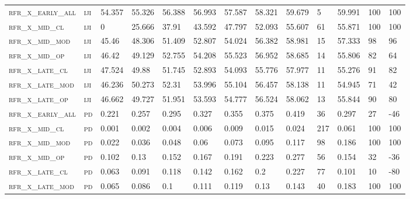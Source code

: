 \begin{landscape}
\begin{center}
\begin{footnotesize}
\begin{longtable}{lllllllllllll}
\textsc{rfr\_x\_early\_all} & \textsc{iji       }   & 54.357  & 55.326  & 56.388   & 56.993   & 57.587   & 58.321   & 59.679   & 5    & 59.991  & 100 & 100   \\
\textsc{rfr\_x\_mid\_cl   } & \textsc{iji       }   & 0       & 25.666  & 37.91    & 43.592   & 47.797   & 52.093   & 55.607   & 61   & 55.871  & 100 & 100   \\
\textsc{rfr\_x\_mid\_mod  } & \textsc{iji       }   & 45.46   & 48.306  & 51.409   & 52.807   & 54.024   & 56.382   & 58.981   & 15   & 57.333  & 98  & 96    \\
\textsc{rfr\_x\_mid\_op   } & \textsc{iji       }   & 46.42   & 49.129  & 52.755   & 54.208   & 55.523   & 56.952   & 58.685   & 14   & 55.806  & 82  & 64    \\
\textsc{rfr\_x\_late\_cl  } & \textsc{iji       }   & 47.524  & 49.88   & 51.745   & 52.893   & 54.093   & 55.776   & 57.977   & 11   & 55.276  & 91  & 82    \\
\textsc{rfr\_x\_late\_mod } & \textsc{iji       }   & 46.236  & 50.273  & 52.31    & 53.996   & 55.104   & 56.457   & 58.138   & 11   & 54.945  & 71  & 42    \\
\textsc{rfr\_x\_late\_op  } & \textsc{iji       }   & 46.662  & 49.727  & 51.951   & 53.593   & 54.777   & 56.524   & 58.062   & 13   & 55.844  & 90  & 80    \\
\textsc{rfr\_x\_early\_all} & \textsc{pd        }   & 0.221   & 0.257   & 0.295    & 0.327    & 0.355    & 0.375    & 0.419    & 36   & 0.297   & 27  & -46   \\
\textsc{rfr\_x\_mid\_cl   } & \textsc{pd        }   & 0.001   & 0.002   & 0.004    & 0.006    & 0.009    & 0.015    & 0.024    & 217  & 0.061   & 100 & 100   \\
\textsc{rfr\_x\_mid\_mod  } & \textsc{pd        }   & 0.022   & 0.036   & 0.048    & 0.06     & 0.073    & 0.095    & 0.117    & 98   & 0.186   & 100 & 100   \\
\textsc{rfr\_x\_mid\_op   } & \textsc{pd        }   & 0.102   & 0.13    & 0.152    & 0.167    & 0.191    & 0.223    & 0.277    & 56   & 0.154   & 32  & -36   \\
\textsc{rfr\_x\_late\_cl  } & \textsc{pd        }   & 0.063   & 0.091   & 0.118    & 0.142    & 0.162    & 0.2      & 0.227    & 77   & 0.101   & 10  & -80   \\
\textsc{rfr\_x\_late\_mod } & \textsc{pd        }   & 0.065   & 0.086   & 0.1      & 0.111    & 0.119    & 0.13     & 0.143    & 40   & 0.183   & 100 & 100   \\

\end{longtable}
\end{footnotesize}
\end{center}
\end{landscape}
